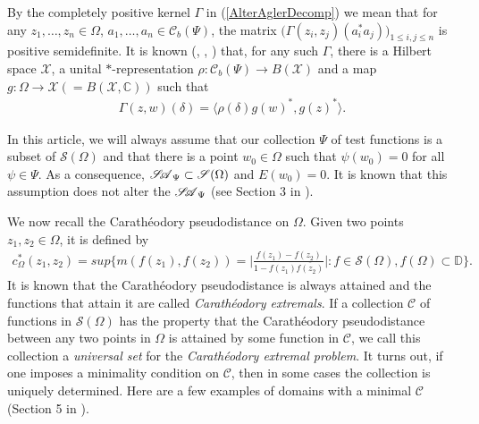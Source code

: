 \documentclass[12pt]{amsart}
\theoremstyle{definition}
\numberwithin{equation}{section}
\newcommand{\X}{\mathscr{X}}
\newcommand{\D}{\mathbb{D}}
\newcommand{\SA}{\mathscr{S\mspace{-5mu}A}}
\newcommand{\CB}{\mathcal{C}_b(\Psi)}
\begin{document}
By the completely positive kernel $\Gamma$ in (\ref{AlterAglerDecomp}) we mean that for any $z_1,\ldots,z_n\in \Omega$, $a_1,\ldots,a_n\in\CB$, the matrix $\big(\Gamma(z_i,z_j)(a^* _i a_j)\big)_{1\leq i,j\leq n}$ is positive semidefinite. It is known (\cite{B-B-F-t}, \cite{B_H}, \cite{B-B-L-S}) that, for any such $\Gamma$, there is a Hilbert space $\X$, a unital $*$-representation $\rho:\CB\rightarrow B(\X)$ and a map $g:\Omega\rightarrow \X (=B(\X,\mathbb{C}))$ such that
\begin{align}\label{Kolmogorov Decomp}
	\Gamma(z,w)(\delta)=\langle \rho(\delta)g(w)^*,g(z)^*\rangle.
\end{align}

In this article, we will always assume that our collection $\Psi$ of test functions is a subset of $\mathscr{S}(\Omega)$ and that there is a point $w_0\in \Omega$ such that $\psi(w_0)=0$ for all $\psi\in \Psi$. As a consequence, $\SA_\Psi\subset\mathscr{S}(\Omega)$ and $E(w_0)=0$. It is known that this assumption does not alter the $\SA_\Psi$ (see Section 3 in \cite{BhatBisCha}).

We now recall the Carath\'eodory pseudodistance on $\Omega$. Given two points $z_1,z_2\in \Omega$, it is defined by 
\begin{align}\label{CaraDefn}
	c_\Omega ^*(z_1,z_2)=sup\Big\{m(f(z_1),f(z_2))=\Big|\frac{f(z_1) -f(z_2)}{1- f(z_1) \overline{f(z_2)}}\Big|:f\in \mathscr{S}(\Omega), f(\Omega)\subset \D\Big\}.
\end{align}
It is known that the Carath\'eodory pseudodistance is always attained and the functions that attain it are called \textit{Carath\'eodory extremals}. If a collection $\mathcal{C}$ of functions in $\mathscr{S}(\Omega)$ has the property that the Carath\'eodory pseudodistance between any two points in $\Omega$ is attained by some function in $\mathcal{C}$, we call this collection  a \textit{universal set} for the \textit{Carath\'eodory extremal problem}. It turns out, if one imposes a minimality condition on $\mathcal{C}$, then in some cases the collection is uniquely determined. Here are a few examples of domains with a minimal $\mathcal{C}$ (Section 5 in \cite{AglLykYouCharac}).
\end{document}
